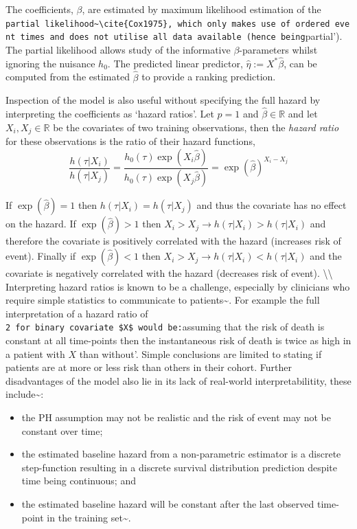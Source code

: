 \documentclass[
  letterpaper,
]{scrbook}
\providecommand{\tightlist}{%
  \setlength{\itemsep}{0pt}\setlength{\parskip}{0pt}}\usepackage{longtable,booktabs,array}
\theoremstyle{plain}
\theoremstyle{definition}
\theoremstyle{remark}
\begin{document}
The coefficients, \(\beta\), are estimated by maximum likelihood
estimation of the
\texttt{partial\ likelihood\textquotesingle{}\textasciitilde{}\textbackslash{}cite\{Cox1975\},\ which\ only\ makes\ use\ of\ ordered\ event\ times\ and\ does\ not\ utilise\ all\ data\ available\ (hence\ being}partial').
The partial likelihood allows study of the informative
\(\beta\)-parameters whilst ignoring the nuisance \(h_0\). The predicted
linear predictor, \(\hat{\eta} := X^*\hat{\beta}\), can be computed from
the estimated \(\hat{\beta}\) to provide a ranking prediction.

Inspection of the model is also useful without specifying the full
hazard by interpreting the coefficients as `hazard ratios'. Let
\(p = 1\) and \(\hat{\beta} \in \mathbb{R}\) and let
\(X_i,X_j \in \mathbb{R}\) be the covariates of two training
observations, then the \emph{hazard ratio} for these observations is the
ratio of their hazard functions, \[
\frac{h(\tau|X_i)}{h(\tau|X_j)} = \frac{h_0(\tau)\exp(X_i\hat{\beta})}{h_0(\tau)\exp(X_j\hat{\beta})} =  \exp(\hat{\beta})^{X_i - X_j}
\]

If \(\exp(\hat{\beta}) = 1\) then \(h(\tau|X_i) = h(\tau|X_j)\) and thus
the covariate has no effect on the hazard. If \(\exp(\hat{\beta}) > 1\)
then \(X_i > X_j \rightarrow h(\tau|X_i) > h(\tau|X_i)\) and therefore
the covariate is positively correlated with the hazard (increases risk
of event). Finally if \(\exp(\hat{\beta}) < 1\) then
\(X_i > X_j \rightarrow h(\tau|X_i) < h(\tau|X_i)\) and the covariate is
negatively correlated with the hazard (decreases risk of event).
\textbackslash\textbackslash{} Interpreting hazard ratios is known to be
a challenge, especially by clinicians who require simple statistics to
communicate to
patients\textasciitilde{}\cite{Sashegyi2017, Spruance2004}. For example
the full interpretation of a hazard ratio of
\texttt{2\textquotesingle{}\ for\ binary\ covariate\ \$X\$\ would\ be:}assuming
that the risk of death is constant at all time-points then the
instantaneous risk of death is twice as high in a patient with \(X\)
than without'. Simple conclusions are limited to stating if patients are
at more or less risk than others in their cohort. Further disadvantages
of the model also lie in its lack of real-world interpretabilitity,
these include\textasciitilde{}\cite{Reid1994}:

\begin{itemize}
\tightlist
\item
  the PH assumption may not be realistic and the risk of event may not
  be constant over time;
\item
  the estimated baseline hazard from a non-parametric estimator is a
  discrete step-function resulting in a discrete survival distribution
  prediction despite time being continuous; and
\item
  the estimated baseline hazard will be constant after the last observed
  time-point in the training set\textasciitilde{}\cite{Gelfand2000}.
\end{itemize}
\end{document}
